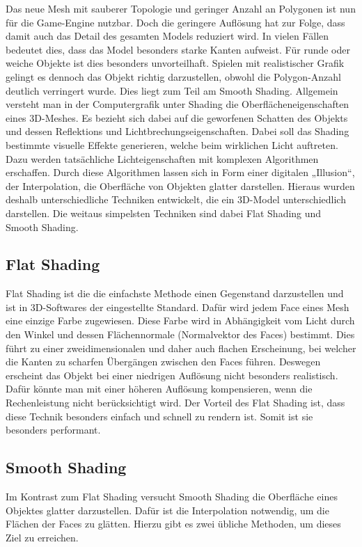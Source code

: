 Das neue Mesh mit sauberer Topologie und geringer Anzahl an Polygonen ist nun für die Game-Engine nutzbar. Doch die geringere Auflösung hat zur Folge, dass damit auch das Detail des gesamten Models reduziert wird. In vielen Fällen bedeutet dies, dass das Model besonders starke Kanten aufweist. Für runde oder weiche Objekte ist dies besonders unvorteilhaft. Spielen mit realistischer Grafik gelingt es dennoch das Objekt richtig darzustellen, obwohl die Polygon-Anzahl deutlich verringert wurde. Dies liegt zum Teil am Smooth Shading.
Allgemein versteht man in der Computergrafik unter Shading die Oberflächeneigenschaften eines 3D-Meshes. Es bezieht sich dabei auf die geworfenen Schatten des Objekts und dessen Reflektions und Lichtbrechungseigenschaften. Dabei soll das Shading bestimmte visuelle Effekte generieren, welche beim wirklichen Licht auftreten. Dazu werden tatsächliche Lichteigenschaften mit komplexen Algorithmen erschaffen. Durch diese Algorithmen lassen sich in Form einer digitalen „Illusion“, der Interpolation, die Oberfläche von Objekten glatter darstellen.
Hieraus wurden deshalb unterschiedliche Techniken entwickelt, die ein 3D-Model unterschiedlich darstellen. Die weitaus simpelsten Techniken sind dabei Flat Shading und Smooth Shading.

\subsection{Flat Shading}

Flat Shading ist die die einfachste Methode einen Gegenstand darzustellen und ist in 3D-Softwares der eingestellte Standard. Dafür wird jedem Face eines Mesh eine einzige Farbe zugewiesen. Diese Farbe wird in Abhängigkeit vom Licht durch den Winkel und dessen Flächennormale (Normalvektor des Faces) bestimmt. Dies führt zu einer zweidimensionalen und daher auch flachen Erscheinung, bei welcher die Kanten zu scharfen Übergängen zwischen den Faces führen. Deswegen erscheint das Objekt bei einer niedrigen Auflösung nicht besonders realistisch. Dafür könnte man mit einer höheren Auflösung kompensieren, wenn die Rechenleistung nicht berücksichtigt wird. Der Vorteil des Flat Shading ist, dass diese Technik besonders einfach und schnell zu rendern ist. Somit ist sie besonders performant.

\subsection{Smooth Shading}

Im Kontrast zum Flat Shading versucht Smooth Shading die Oberfläche eines Objektes glatter darzustellen. Dafür ist die Interpolation notwendig, um die Flächen der Faces zu glätten. Hierzu gibt es zwei übliche Methoden, um dieses Ziel zu erreichen.

